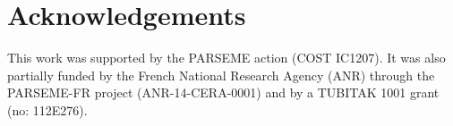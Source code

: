 \documentclass[output=paper]{LSP/langsci}
\begin{document}
\section*{Acknowledgements}

This work was supported by the PARSEME action (COST IC1207).  It was also partially funded by the French National Research Agency (ANR) through the PARSEME-FR project (ANR-14-CERA-0001) and by a TUBITAK 1001 grant (no: 112E276).

\printbibliography[heading=subbibliography,notkeyword=this]
\end{document}
